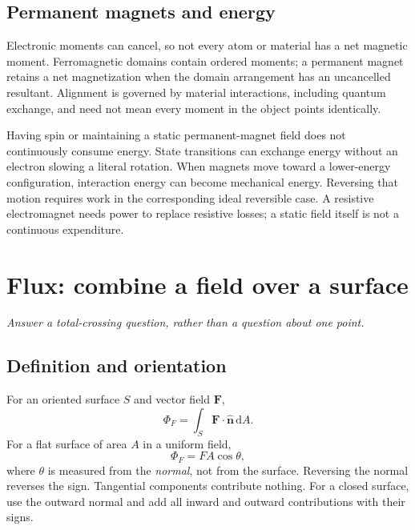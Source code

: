 \documentclass[11pt,letterpaper]{article}
\newcommand{\vect}[1]{\boldsymbol{#1}}
\newcommand{\dd}{\,\mathrm d}
\newcommand{\topic}[2]{\section{#1}\textit{#2}\par}
\begin{document}
\subsection*{Permanent magnets and energy}
Electronic moments can cancel, so not every atom or material has a net magnetic moment. Ferromagnetic domains contain ordered moments; a permanent magnet retains a net magnetization when the domain arrangement has an uncancelled resultant. Alignment is governed by material interactions, including quantum exchange, and need not mean every moment in the object points identically.\cite{domains}

Having spin or maintaining a static permanent-magnet field does not continuously consume energy. State transitions can exchange energy without an electron slowing a literal rotation. When magnets move toward a lower-energy configuration, interaction energy can become mechanical energy. Reversing that motion requires work in the corresponding ideal reversible case. A resistive electromagnet needs power to replace resistive losses; a static field itself is not a continuous expenditure.\cite{spin,magenergy}

\newpage
\topic{Flux: combine a field over a surface}{Answer a total-crossing question, rather than a question about one point.}

\subsection*{Definition and orientation}
For an oriented surface $S$ and vector field $\vect F$,
\begin{equation}
\Phi_F=\int_S\vect F\cdot\hat{\vect n}\dd A.
\end{equation}
For a flat surface of area $A$ in a uniform field,
\[
\Phi_F=FA\cos\theta,
\]
where $\theta$ is measured from the \emph{normal}, not from the surface. Reversing the normal reverses the sign. Tangential components contribute nothing. For a closed surface, use the outward normal and add all inward and outward contributions with their signs.

\begin{center}
\end{center}
\end{document}
